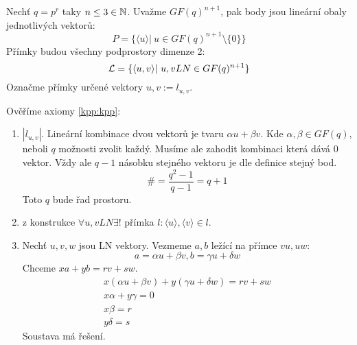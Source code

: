\begin{example}
	Nechť $q = p^r$ taky $n \leq 3 \in \operatorname{\mathbb{N}}$.
	Uvažme $GF(q)^{n + 1}$, pak body jsou lineární obaly jednotlivých vektorů:
	\[ P = \{ \langle u \rangle |\ u \in GF(q)^{n + 1} \setminus \{ 0 \} \} \]
	Přímky budou všechny podprostory dimenze 2:
	\[ \operatorname{\mathcal{L}} = \{ \langle u, v \rangle |\ u,v LN \in GF(q)^{n + 1} \} \]
	Označme přímky určené vektory $u, v := l_{u, v}$.

	Ověříme axiomy \cref{kpp:kpp}:
	\begin{enumerate}
		\item $|l_{u, v}|$.
			Lineární kombinace dvou vektorů je tvaru $\alpha u + \beta v$.
			Kde $\alpha, \beta \in GF(q)$, neboli $q$ možnosti zvolit každý.
			Musíme ale zahodit kombinaci která dává 0 vektor.
			Vždy ale $q - 1$ násobku stejného vektoru je dle definice stejný bod.
			\[ \# = \frac{q^2 - 1}{q - 1} = q + 1 \]
			Toto $q$ bude řad prostoru.
		\item z konstrukce $\forall u, v LN \exists!$ přímka $l: \langle u \rangle, \langle v \rangle \in l$.
		\item Nechť $u, v, w$ jsou LN vektory.
			Vezmeme $a, b$ ležící na přímce $vu, uw$:
			\[ a = \alpha u + \beta v, b = \gamma u + \delta w \]
			Chceme $xa + yb = rv + sw$.
			\begin{gather*}
				x(\alpha u + \beta v) + y(\gamma u + \delta w) = rv + sw \\
				x \alpha + y \gamma = 0 \\
				x \beta = r \\
				y \delta = s
			\end{gather*}
			Soustava má řešení.
	\end{enumerate}
\end{example}


